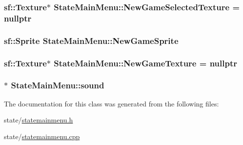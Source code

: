 \subsubsection[{\texorpdfstring{New\+Game\+Selected\+Texture}{NewGameSelectedTexture}}]{\setlength{\rightskip}{0pt plus 5cm}sf\+::\+Texture$\ast$ State\+Main\+Menu\+::\+New\+Game\+Selected\+Texture = nullptr\hspace{0.3cm}{\ttfamily [protected]}}\hypertarget{classStateMainMenu_aa6bcd3d4dd129313a0b0c53868bb8334}{}\label{classStateMainMenu_aa6bcd3d4dd129313a0b0c53868bb8334}
\subsubsection[{\texorpdfstring{New\+Game\+Sprite}{NewGameSprite}}]{\setlength{\rightskip}{0pt plus 5cm}sf\+::\+Sprite State\+Main\+Menu\+::\+New\+Game\+Sprite\hspace{0.3cm}{\ttfamily [protected]}}\hypertarget{classStateMainMenu_adc3e471543be20775b7c8272c8660991}{}\label{classStateMainMenu_adc3e471543be20775b7c8272c8660991}
\subsubsection[{\texorpdfstring{New\+Game\+Texture}{NewGameTexture}}]{\setlength{\rightskip}{0pt plus 5cm}sf\+::\+Texture$\ast$ State\+Main\+Menu\+::\+New\+Game\+Texture = nullptr\hspace{0.3cm}{\ttfamily [protected]}}\hypertarget{classStateMainMenu_a8c54545853bf8f34ca224ff4030016dd}{}\label{classStateMainMenu_a8c54545853bf8f34ca224ff4030016dd}
\subsubsection[{\texorpdfstring{sound}{sound}}]{$\ast$ State\+Main\+Menu\+::sound\hspace{0.3cm}{\ttfamily [protected]}}\hypertarget{classStateMainMenu_a6095be3835bac4e3de32ff1700cf8dcd}{}\label{classStateMainMenu_a6095be3835bac4e3de32ff1700cf8dcd}


The documentation for this class was generated from the following files\+:\begin{DoxyCompactItemize}
\item 
state/\hyperlink{statemainmenu_8h}{statemainmenu.\+h}\item 
state/\hyperlink{statemainmenu_8cpp}{statemainmenu.\+cpp}\end{DoxyCompactItemize}
